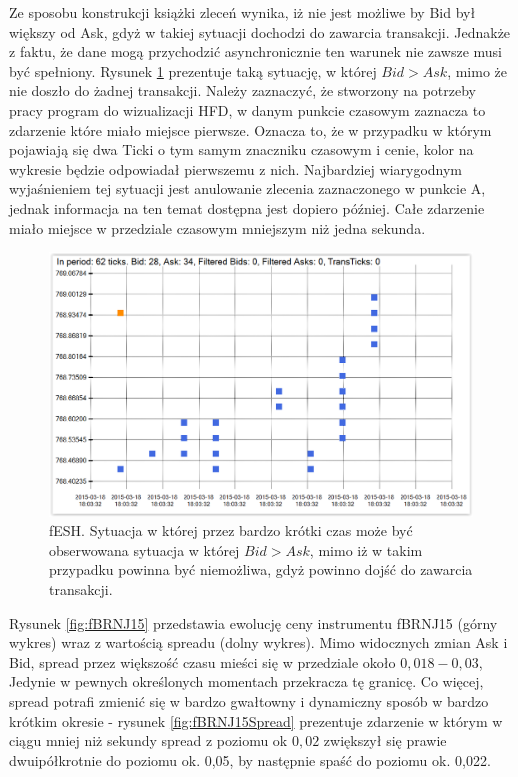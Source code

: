 \documentclass[a4paper,12pt,openany, DIV=calc, headsepline]{scrbook}
\begin{document}
Ze sposobu konstrukcji książki zleceń wynika, iż nie jest możliwe by Bid był większy od Ask, gdyż w takiej sytuacji dochodzi do zawarcia transakcji. Jednakże z faktu, że dane mogą przychodzić asynchronicznie ten warunek nie zawsze musi być spełniony. Rysunek \ref{fig:fpah15} prezentuje taką sytuację, w której $Bid > Ask$, mimo że nie doszło do żadnej transakcji. Należy zaznaczyć, że stworzony na potrzeby pracy program do wizualizacji HFD, w danym punkcie czasowym zaznacza to zdarzenie które miało miejsce pierwsze. Oznacza to, że w przypadku w którym pojawiają się dwa Ticki o tym samym znaczniku czasowym i cenie, kolor na wykresie będzie odpowiadał pierwszemu z nich. Najbardziej wiarygodnym wyjaśnieniem tej sytuacji jest anulowanie zlecenia zaznaczonego w punkcie A, jednak informacja na ten temat dostępna jest dopiero później. Całe zdarzenie miało miejsce w przedziale czasowym mniejszym niż jedna sekunda.


\begin{figure}[H]
  \centering
  \includegraphics[scale=0.5]{wykresy/fpah15.PNG}
  \caption{fESH. Sytuacja w której przez bardzo krótki czas może być obserwowana sytuacja w której $Bid > Ask$, mimo iż w takim przypadku powinna być niemożliwa, gdyż powinno dojść do zawarcia transakcji.}
  \label{fig:fpah15}
\end{figure}

Rysunek \ref{fig:fBRNJ15} przedstawia ewolucję ceny instrumentu fBRNJ15 (górny wykres) wraz z wartością spreadu (dolny wykres). Mimo widocznych zmian Ask i Bid, spread przez większość czasu mieści się w przedziale około $0,018-0,03$, Jedynie w pewnych określonych momentach przekracza tę granicę. Co więcej, spread potrafi zmienić się w bardzo gwałtowny i dynamiczny sposób w bardzo krótkim okresie - rysunek \ref{fig:fBRNJ15Spread} prezentuje zdarzenie w którym w ciągu mniej niż sekundy spread z poziomu ok $0,02$ zwiększył się prawie dwuipółkrotnie do poziomu ok. 0,05, by następnie spaść do poziomu ok. 0,022. 
\end{document}
